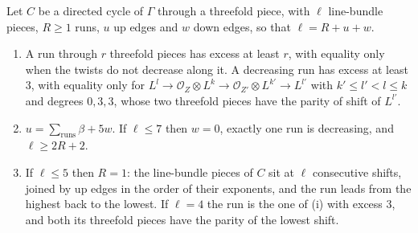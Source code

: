 \begin{lemma}\label{lem:cycleshape}
Let $C$ be a directed cycle of $\Gamma$ through a threefold piece, with $\ell$ line-bundle pieces, $R\ge1$ runs, $u$ up edges and $w$ down edges, so that $\ell=R+u+w$.
\begin{enumerate}[label=\textup{(\roman*)},leftmargin=2.4em,itemsep=2pt]
\item A run through $r$ threefold pieces has excess at least $r$, with equality only when the twists do not decrease along it. A decreasing run has excess at least $3$, with equality only for $L^{l}\to\mathcal{O}_{Z}\otimes L^{k}\to\mathcal{O}_{Z'}\otimes L^{k'}\to L^{l'}$ with $k'\le l'<l\le k$ and degrees $0,3,3$, whose two threefold pieces have the parity of shift of $L^{l'}$.
\item $u=\sum_{\mathrm{runs}}\beta+5w$. If $\ell\le7$ then $w=0$, exactly one run is decreasing, and $\ell\ge2R+2$.
\item If $\ell\le5$ then $R=1$: the line-bundle pieces of $C$ sit at $\ell$ consecutive shifts, joined by up edges in the order of their exponents, and the run leads from the highest back to the lowest. If $\ell=4$ the run is the one of (i) with excess $3$, and both its threefold pieces have the parity of the lowest shift.
\end{enumerate}
\end{lemma}

